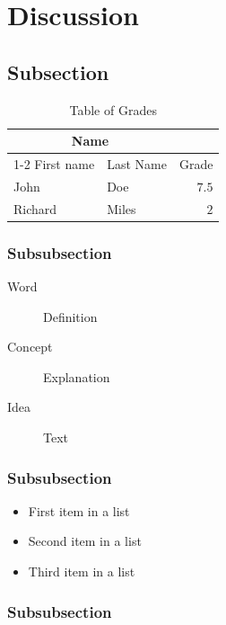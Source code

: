 \documentclass[fleqn,10pt]{SelfArx} %
\begin{document}
\section{Discussion}

\lipsum[10] %

\subsection{Subsection}

\lipsum[11] %

\begin{table}[hbt]
\caption{Table of Grades}
\centering
\begin{tabular}{llr}
\toprule
\multicolumn{2}{c}{Name} \\
\cmidrule(r){1-2}
First name & Last Name & Grade \\
\midrule
John & Doe & $7.5$ \\
Richard & Miles & $2$ \\
\bottomrule
\end{tabular}
\label{tab:label}
\end{table}

\subsubsection*{Subsubsection}

\lipsum[12] %

\begin{description}
\item[Word] Definition
\item[Concept] Explanation
\item[Idea] Text
\end{description}

\subsubsection*{Subsubsection}

\lipsum[13] %

\begin{itemize}[noitemsep] %
\item First item in a list
\item Second item in a list
\item Third item in a list
\end{itemize}

\subsubsection*{Subsubsection}
\end{document}

